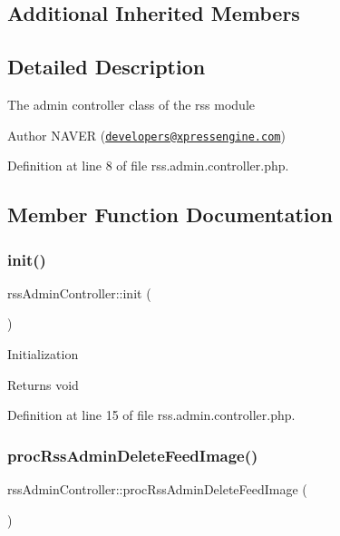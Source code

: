\subsection*{Additional Inherited Members}


\subsection{Detailed Description}
The admin controller class of the rss module

\begin{DoxyAuthor}{Author}
N\+A\+V\+ER (\href{mailto:developers@xpressengine.com}{\tt developers@xpressengine.\+com}) 
\end{DoxyAuthor}


Definition at line 8 of file rss.\+admin.\+controller.\+php.



\subsection{Member Function Documentation}
\hypertarget{classrssAdminController_ad73e127c3d6191b7d82e2fd3f50ef477}{}\label{classrssAdminController_ad73e127c3d6191b7d82e2fd3f50ef477} 
\subsubsection{\texorpdfstring{init()}{init()}}
{\footnotesize\ttfamily rss\+Admin\+Controller\+::init (\begin{DoxyParamCaption}{ }\end{DoxyParamCaption})}

Initialization

\begin{DoxyReturn}{Returns}
void 
\end{DoxyReturn}


Definition at line 15 of file rss.\+admin.\+controller.\+php.

\hypertarget{classrssAdminController_a37eed33f761ae0a1cdcce49562bed601}{}\label{classrssAdminController_a37eed33f761ae0a1cdcce49562bed601} 
\subsubsection{\texorpdfstring{proc\+Rss\+Admin\+Delete\+Feed\+Image()}{procRssAdminDeleteFeedImage()}}
{\footnotesize\ttfamily rss\+Admin\+Controller\+::proc\+Rss\+Admin\+Delete\+Feed\+Image (\begin{DoxyParamCaption}{ }\end{DoxyParamCaption})}



